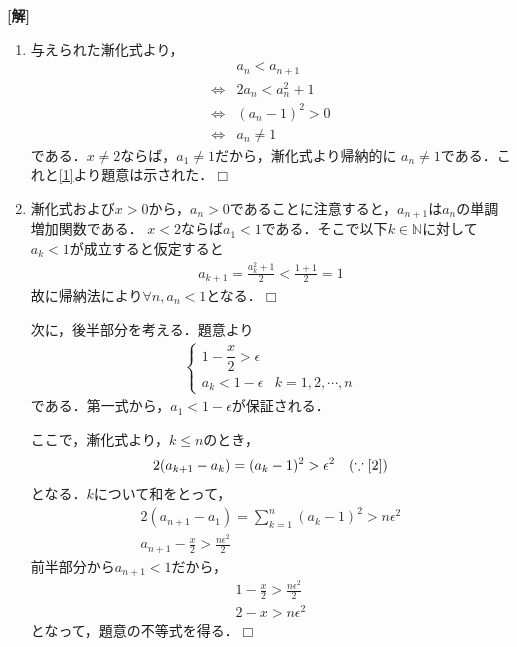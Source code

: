 \documentclass[a4j]{jarticle}
\begin{document}
\setlength{\columnseprule}{0.4pt}
\begin{multicols}{2}
{\bf[解]} 
\begin{enumerate}[(1)]
\item 与えられた漸化式より，
     \begin{align}
     &a_n<a_{n+1}\nonumber\\
     \Longleftrightarrow&2a_n<a_n^2+1\nonumber\\
     \Longleftrightarrow&(a_n-1)^2>0\nonumber\\
     \Longleftrightarrow&a_n\not=1\label{1}
     \end{align}
である．$x\not=2$ならば，$a_1\not=1$だから，漸化式より帰納的に
$a_n\not=1$である．これと\eqref{1}より題意は示された．$\Box$     
  
 \item 漸化式および$x>0$から，$a_n>0$であることに注意すると，$a_{n+1}$は$a_n$の単調増加関数である．
$x<2$ならば$a_1<1$である．そこで以下$k\in\mathbb{N}$に対して$a_k<1$が成立すると仮定すると
     \begin{align*}
     a_{k+1}=\frac{a_k^2+1}{2}<\frac{1+1}{2}=1
     \end{align*}
故に帰納法により$\forall n,a_n<1$となる．$\Box$

次に，後半部分を考える．題意より
     \begin{align}
          \left\{\begin{array}{ll}
          1-\dfrac{x}{2}>\epsilon\\
          a_k<1-\epsilon&k=1,2,\cdots,n
          \end{array}\right.\label{2}
      \end{align}
である．第一式から，$a_1<1-\epsilon$が保証される．

ここで，漸化式より，$k\le n$のとき，
     \begin{align*}
     &2(a_{k+1}-a_k)=(a_k-1)^2>\epsilon^2&(\because\eqref{2})
     \end{align*}     
となる．$k$について和をとって，
     \begin{align*}
     2(a_{n+1}-a_1)=\sum_{k=1}^n (a_k-1)^2>n\epsilon^2 \\
     a_{n+1}-\frac{x}{2}>\frac{n\epsilon^2}{2}
     \end{align*}
前半部分から$a_{n+1}<1$だから，    
     \begin{align*}
     1-\frac{x}{2}>\frac{n\epsilon^2}{2} \\
     2-x>n\epsilon^2
     \end{align*}
となって，題意の不等式を得る．$\Box$
\end{enumerate}
\newpage
\end{multicols}
\end{document}
